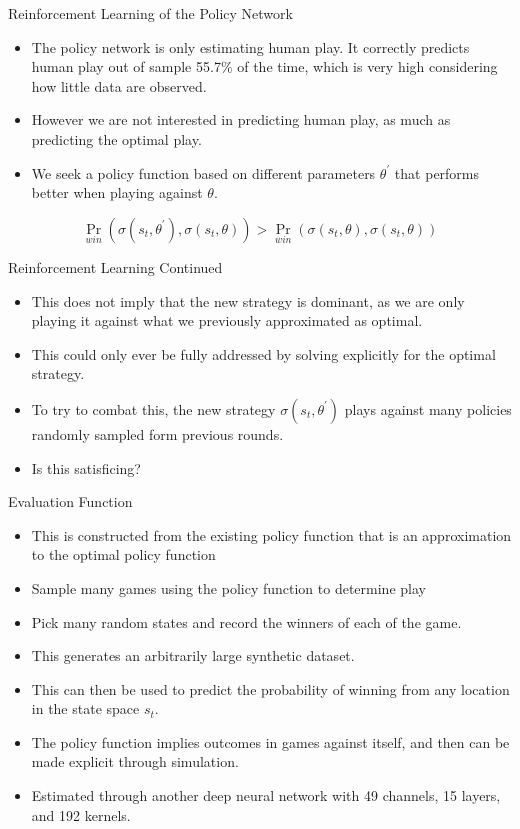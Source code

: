 \documentclass[presentation]{beamer}
\begin{document}
\begin{frame}[label={sec:org940c2cb}]{Reinforcement Learning of the Policy Network}
\begin{itemize}
\item The policy network is only estimating human play. It correctly
predicts human play out of sample 55.7\% of the time, which is very
high considering how little data are observed.
\item However we are not interested in predicting human play, as much as
predicting the optimal play.
\item We seek a policy function based on different parameters \(\theta^{\prime}\)
that performs better when playing against \(\theta\).
\end{itemize}

\begin{equation*}
  \Pr_{win}\left( \sigma(s_t, \theta^{\prime}), \sigma(s_t, \theta) \right) > \Pr_{win}\left(
    \sigma(s_t, \theta), \sigma(s_t, \theta) \right)
\end{equation*}
\end{frame}

\begin{frame}[label={sec:orgfe19edd}]{Reinforcement Learning Continued}
\begin{itemize}
\item This does not imply that the new strategy is dominant, as we are
only playing it against what we previously approximated as optimal.
\item This could only ever be fully addressed by solving explicitly for the
optimal strategy.
\item To try to combat this, the new strategy \(\sigma(s_t, \theta^{\prime})\) plays
against many policies randomly sampled form previous rounds.
\item Is this satisficing?
\end{itemize}
\end{frame}

\begin{frame}[label={sec:org8b648c0}]{Evaluation Function}
\begin{itemize}
\item This is constructed from the existing policy function that is an
approximation to the optimal policy function
\item Sample many games using the policy function to determine play
\item Pick many random states and record the winners of each of the game.
\item This generates an arbitrarily large synthetic dataset.
\item This can then be used to predict the probability of winning from any
location in the state space \(s_t\).
\item The policy function implies outcomes in games against itself, and
then can be made explicit through simulation.
\item Estimated through another deep neural network with 49 channels, 15
layers, and 192 kernels.
\end{itemize}
\end{frame}
\end{document}
